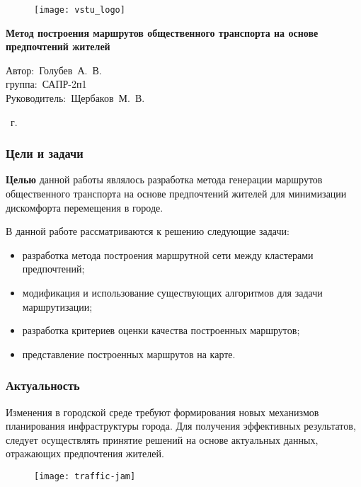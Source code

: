 \begin{frame}
    \begin{figure}
        \hspace*{-320pt}\texttt{[image: vstu\_logo]}
    \end{figure}
    \vspace{2em}
    \begin{center}
        \large
        \textbf{Метод построения маршрутов общественного транспорта на основе предпочтений жителей}\\
    \end{center}
    \vspace{2em}
    \begin{flushleft}
        \hspace{12em}Автор:~Голубев~А.~В.\\
        \hspace{12em}группа:~САПР-2п1\\
        \hspace{12em}Руководитель:~Щербаков~М.~В.
    \end{flushleft}
    \vspace{3em}
     \the\year\ г.
\end{frame}

\begin{frame}
    \frametitle{Цели и задачи}
    \textbf{Целью} данной работы являлось разработка метода генерации маршрутов общественного транспорта на 
    основе предпочтений жителей для минимизации дискомфорта перемещения в городе.

    В данной работе рассматриваются к решению следующие задачи:
    \begin{itemize}
        \item разработка метода построения маршрутной сети между кластерами предпочтений;
        \item модификация и использование существующих алгоритмов для задачи маршрутизации;
        \item разработка критериев оценки качества построенных маршрутов;
        \item представление построенных маршрутов на карте.
    \end{itemize}
\end{frame}

\begin{frame}
    \frametitle{Актуальность}
    Изменения в городской среде требуют формирования новых механизмов планирования инфраструктуры города. 
    Для получения эффективных результатов, следует осуществлять принятие решений на основе актуальных 
    данных, отражающих предпочтения жителей.
    \begin{figure}
        \texttt{[image: traffic-jam]}
    \end{figure}
\end{frame}

